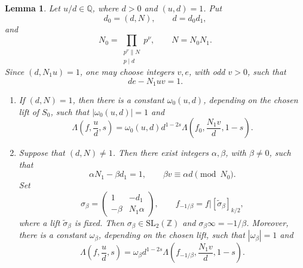 \documentclass[11pt]{amsart}
\newtheorem{lemma}[theorem]{Lemma}
\theoremstyle{remark}
\newcommand{\Q}{\mathbb Q}
\newcommand{\Z}{\mathbb Z}
\newcommand{\wt}{\widetilde}
\begin{document}
\begin{lemma}\label{lem:additive-fe}
Let $u/d\in\Q$, where $d>0$ and $(u,d)=1$. Put
\[
d_0=(d,N),\qquad d=d_0d_1,
\]
and
\[
N_0=\prod_{\substack{p^\nu\parallel N\\p\mid d}}p^\nu,
\qquad N=N_0N_1.
\]
Since $(d,N_1u)=1$, one may choose integers $v,e$, with odd $v>0$, such that
\[
de-N_1uv=1.
\]
\begin{enumerate}[label=\textup{(\arabic*)}]
\item If $(d,N)=1$, then there is a constant $\omega_0(u,d)$, depending on the chosen lift of $S_0$, such that $|\omega_0(u,d)|=1$ and
\[
\Lambda\left(f,\frac ud,s\right)
=\omega_0(u,d)d^{1-2s}
\Lambda\left(f_0,\frac{N_1v}{d},1-s\right).
\]
\item Suppose that $(d,N)\ne1$. Then there exist integers $\alpha,\beta$, with $\beta\ne0$, such that
\[
\alpha N_1-\beta d_1=1,
\qquad
\beta v\equiv\alpha d\pmod{N_0}.
\]
Set
\[
\sigma_\beta=
\begin{pmatrix}1&-d_1\\-\beta&N_1\alpha\end{pmatrix},
\qquad
f_{-1/\beta}=f|[\wt\sigma_\beta]_{k/2},
\]
where a lift $\wt\sigma_\beta$ is fixed. Then $\sigma_\beta\in\mathrm{SL}_2(\Z)$ and $\sigma_\beta\infty=-1/\beta$. Moreover, there is a constant $\omega_\beta$, depending on the chosen lift, such that $|\omega_\beta|=1$ and
\[
\Lambda\left(f,\frac ud,s\right)
=\omega_\beta d^{1-2s}
\Lambda\left(f_{-1/\beta},\frac{N_1v}{d},1-s\right).
\]
\end{enumerate}
\end{lemma}
\end{document}

